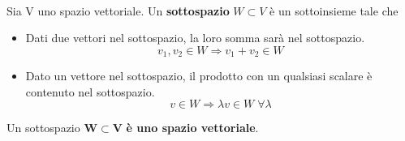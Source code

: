 \documentclass[a4paper, 12pt]{report}
\begin{document}
                \paragraph{}Sia V uno spazio vettoriale. Un \textbf{sottospazio} $W \subset V$ è
                un sottoinsieme tale che
                    \begin{itemize}
                        \item Dati due vettori nel sottospazio, la loro somma sarà nel sottospazio. $$v_1,v_2 \in W \Rightarrow v_1+v_2 \in W$$
                        \item Dato un vettore nel sottospazio, il prodotto con un qualsiasi scalare è contenuto nel sottospazio. $$v \in W \Rightarrow \lambda v \in W \; \forall \lambda$$
                    \end{itemize} 
                Un sottospazio $\boldsymbol{W \subset V}$ \textbf{è uno spazio vettoriale}.
\end{document}
